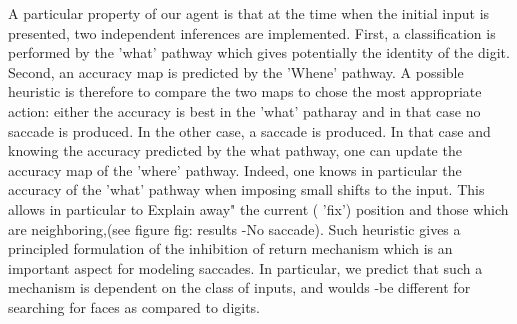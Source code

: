 A particular property of our agent
is that at the time when the initial
input is presented, two independent inferences
are implemented. First, a classification
is performed by the 'what' pathway which
gives potentially the identity of the digit.
Second, an accuracy map is predicted
by the 'Whene' pathway. A possible heuristic
is therefore to compare the two maps to
chose the most appropriate action: either
the accuracy is best in the 'what'
patharay and in that case no saccade
is produced. In the other case, a
saccade is produced. In that case and
knowing the accuracy predicted by the
what pathway, one can update the
accuracy map of the 'where' pathway.
Indeed, one knows in particular the
accuracy of the 'what' pathway when
imposing small shifts to the input.
This allows in particular to Explain
away" the current ( 'fix') position and
those which are neighboring,(see figure
{fig: results} -No saccade). Such heuristic
gives a principled formulation of the
inhibition of return mechanism which
is an important aspect for modeling saccades.
In particular, we predict that such a
mechanism is dependent on the class
of inputs, and woulds -be different for
searching for faces as compared to digits.
